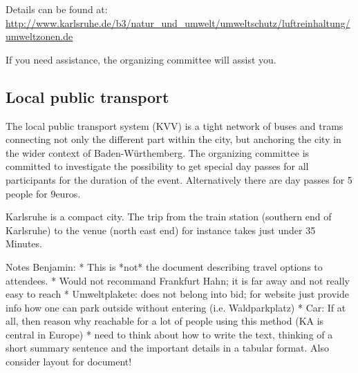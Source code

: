 Details can be found at:
\url{http://www.karlsruhe.de/b3/natur_und_umwelt/umweltschutz/luftreinhaltung/umweltzonen.de}

If you need assistance, the organizing committee will assist you.

\subsection{Local public transport}



The local public transport system (KVV) is a tight network of buses and trams connecting not only the different part within the city, but anchoring the city in the wider context of Baden-Würthemberg. The organizing committee is committed to investigate the possibility to get special day passes for all participants for the duration of the event. Alternatively there are day passes for 5 people for 9euros.

Karlsruhe is a compact city. The trip from the train station (southern end of Karlsruhe) to the venue (north east end) for instance takes just under 35 Minutes.



Notes Benjamin:
 * This is *not* the document describing travel options to attendees.
 * Would not recommand Frankfurt Hahn; it is far away and not really easy to reach
 * Umweltplakete: does not belong into bid; for website just provide info how one can park outside without entering (i.e. Waldparkplatz)
 * Car: If at all, then reason why reachable for a lot of people using this method (KA is central in Europe)
 * need to think about how to write the text, thinking of a short summary sentence and the important details in a tabular format. Also consider layout for document!
